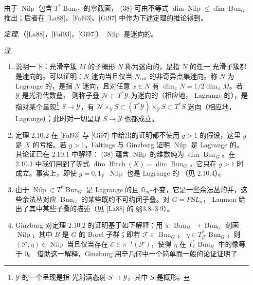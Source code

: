 
由于 $\operatorname{Nilp}$ 包含 $T^{*}\operatorname{Bun}_G$ 的零截面，
(38) 可由不等式
$\dim\operatorname{Nilp}\le\dim\operatorname{Bun}_G$ 推出；后者在
[La88]、[Fal93]、[Gi97] 中作为下述定理的推论得到。

 \emph{定理.}（[La88]，[Fal93]，[Gi97]）
$\operatorname{Nilp}$ 是迷向的。

\emph{注.}
\begin{enumerate}[label=(\roman*),leftmargin=2.6em]
\item 说明一下：光滑辛簇 $M$ 的子概形 $N$ 称为迷向的，是指 $N$ 的任一
  光滑子簇都是迷向的。可以证明：$N$ 迷向当且仅当 $N_{\mathrm{red}}$
  的非奇异点集迷向。称 $N$ 为 Lagrange 的，是指 $N$ 迷向，且对任意
  $x\in N$ 有 $\dim_x N=1/2\dim_x M$。若 $\mathcal{Y}$ 是光滑代数叠，
  则称子叠 $\mathcal{N}\subset T^{*}\mathcal{Y}$ 为迷向的（相应地，
  Lagrange 的），是指对某个呈现\footnote{$\mathcal{Y}$ 的一个呈现是指
  光滑满态射 $S\to\mathcal{Y}$，其中 $S$ 是概形。}
  $S\to\mathcal{Y}$，有
  $\mathcal{N}\times_{\mathcal{Y}}S\subset
  (T^{*}\mathcal{Y})\times_{\mathcal{Y}}S\subset T^{*}S$
  迷向（相应地，Lagrange）；此时对一切呈现 $S\to\mathcal{Y}$ 也都成立。
\item 定理 2.10.2 在 [Fal93] 与 [Gi97] 中给出的证明都不使用 $g>1$
  的假设，这里 $g$ 是 $X$ 的亏格。若 $g>1$，Faltings 与 Ginzburg
  证明 $\operatorname{Nilp}$ 是 Lagrange 的。其论证已在 2.10.1 中解释：
  (38) 蕴含 $\operatorname{Nilp}$ 的维数纯为
  $\dim\operatorname{Bun}_G$。在 2.10.1 中我们用到了等式
  $\dim\operatorname{Hitch}(X)=\dim\operatorname{Bun}_G$，它只在 $g>1$
  时成立。事实上，即使 $g=0,1$，$\operatorname{Nilp}$ 也是 Lagrange 的
  （见 2.10.4）。
\item 由于 $\operatorname{Nilp}\subset T^{*}\operatorname{Bun}_G$ 是
  Lagrange 的且 $\mathbb{G}_m$-不变，它是一些余法丛的并，这些余法丛对应
  $\operatorname{Bun}_G$ 的某些既约不可约闭子叠。对 $G=PSL_n$，
  Laumon 给出了其中某些子叠的描述（见 [La88] 的 §§3.8--3.9）。
\item Ginzburg 对定理 2.10.2 的证明基于如下解释：用
  $\pi:\operatorname{Bun}_B\to\operatorname{Bun}_G$ 刻画
  $\operatorname{Nilp}$，其中 $B$ 是 $G$ 的 Borel 子群；即若
  $\mathcal{F}\in\operatorname{Bun}_G$，
  $\eta\in T^{*}_{\mathcal{F}}\operatorname{Bun}_G$，则
  $(\mathcal{F},\eta)\in\operatorname{Nilp}$
  当且仅当存在 $\mathcal{E}\in\pi^{-1}(\mathcal{F})$，使得 $\eta$ 在
  $T^{*}_{\mathcal{E}}\operatorname{Bun}_B$ 中的像等于 $0$。
  借助这一解释，Ginzburg 用辛几何中一个简单而一般的论证证明了

\end{enumerate}
